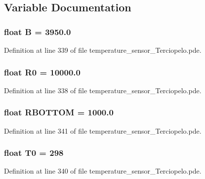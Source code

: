 \subsection{Variable Documentation}
\hypertarget{applet_2temperature__sensor___terciopelo_8pde_8188fea1f6709096fe21a3ee084d00d0}{
\subsubsection[{B}]{\setlength{\rightskip}{0pt plus 5cm}float {\bf B} = 3950.0}}
\label{applet_2temperature__sensor___terciopelo_8pde_8188fea1f6709096fe21a3ee084d00d0}




Definition at line 339 of file temperature\_\-sensor\_\-Terciopelo.pde.\hypertarget{applet_2temperature__sensor___terciopelo_8pde_735577560ca40e5b6008a98829068904}{
\subsubsection[{R0}]{\setlength{\rightskip}{0pt plus 5cm}float {\bf R0} = 10000.0}}
\label{applet_2temperature__sensor___terciopelo_8pde_735577560ca40e5b6008a98829068904}




Definition at line 338 of file temperature\_\-sensor\_\-Terciopelo.pde.\hypertarget{applet_2temperature__sensor___terciopelo_8pde_d17df5990b551ac9e97a3d60f65833ff}{
\subsubsection[{RBOTTOM}]{\setlength{\rightskip}{0pt plus 5cm}float {\bf RBOTTOM} = 1000.0}}
\label{applet_2temperature__sensor___terciopelo_8pde_d17df5990b551ac9e97a3d60f65833ff}




Definition at line 341 of file temperature\_\-sensor\_\-Terciopelo.pde.\hypertarget{applet_2temperature__sensor___terciopelo_8pde_4211ba1269f650e21964d32238a460b2}{
\subsubsection[{T0}]{\setlength{\rightskip}{0pt plus 5cm}float {\bf T0} = 298}}
\label{applet_2temperature__sensor___terciopelo_8pde_4211ba1269f650e21964d32238a460b2}




Definition at line 340 of file temperature\_\-sensor\_\-Terciopelo.pde.